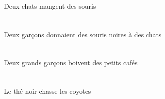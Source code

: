 \begin{exe}
\ex\glll
\INDDuErg{}   \chatDDuErg{}   \INDPlAbs{}   \sourisBPlAbs{}  \mangerVtPrsBPl{}\\
\INDDuErgP{}   \chatDDuErgP{}   \INDPlAbsP{}   \sourisBPlAbsP{}  \mangerVtPrsBPlP{}\\
\INDDuErgG{}   \chatDDuErgG{}   \INDPlAbsG{}   \sourisBPlAbsG{}  \mangerVtPrsBPlG{}\\
Deux chats mangent des souris
\ex\glll
\INDDuErg{}   \garconDDuErg{}    \INDPlDat{}   \chatDPlDat{}   \INDPlAbs{}   \noirBPl{}   \sourisBPlAbs{}  \donnerVdPstBPl{}\\
\INDDuErgP{}   \garconDDuErgP{}    \INDPlDatP{}   \chatDPlDatP{}   \INDPlAbsP{}   \noirBPlP{}   \sourisBPlAbsP{}  \donnerVdPstBPlP{}\\
\INDDuErgG{}   \garconDDuErgG{}    \INDPlDatG{}   \chatDPlDatG{}   \INDPlAbsG{}   \noirBPlG{}   \sourisBPlAbsG{}  \donnerVdPstBPlG{}\\
Deux garçons donnaient des souris noires à des chats
\ex\glll
\INDDuErg{}   \grandDDu{}   \garconDDuErg{}   \INDPlAbs{}   \petitCPl{}   \cafeCPlAbs{}  \boireVtPrsCPl{}\\
\INDDuErgP{}   \grandDDuP{}   \garconDDuErgP{}   \INDPlAbsP{}   \petitCPlP{}   \cafeCPlAbsP{}  \boireVtPrsCPlP{}\\
\INDDuErgG{}   \grandDDuG{}   \garconDDuErgG{}   \INDPlAbsG{}   \petitCPlG{}   \cafeCPlAbsG{}  \boireVtPrsCPlG{}\\
Deux grands garçons boivent des petits cafés
\ex\glll
\DEFSgErg{}   \noirBSg{}   \theBSgErg{}   \DEFPlAbs{}   \coyoteCPlAbs{}  \chasserVtPrsCPl{}\\
\DEFSgErgP{}   \noirBSgP{}   \theBSgErgP{}   \DEFPlAbsP{}   \coyoteCPlAbsP{}  \chasserVtPrsCPlP{}\\
\DEFSgErgG{}   \noirBSgG{}   \theBSgErgG{}   \DEFPlAbsG{}   \coyoteCPlAbsG{}  \chasserVtPrsCPlG{}\\
Le thé noir chasse les coyotes
\ex\glll
\DEMPlErg{}   \troisCPl{}   \chasseurCPlErg{}    \DEFSgDat{}   \petitDSg{}   \blancDSg{}   \garconDSgDat{}   \INDDuAbs{}    \DEFPlObl{}   \plaineAPlObl{}   \DE{}   \autrucheBDuAbs{}  \offrirVdPstBDu{}\\
\DEMPlErgP{}   \troisCPlP{}   \chasseurCPlErgP{}    \DEFSgDatP{}   \petitDSgP{}   \blancDSgP{}   \garconDSgDatP{}   \INDDuAbsP{}    \DEFPlOblP{}   \plaineAPlOblP{}   \DEP{}   \autrucheBDuAbsP{}  \offrirVdPstBDuP{}\\
\DEMPlErgG{}   \troisCPlG{}   \chasseurCPlErgG{}    \DEFSgDatG{}   \petitDSgG{}   \blancDSgG{}   \garconDSgDatG{}   \INDDuAbsG{}    \DEFPlOblG{}   \plaineAPlOblG{}   \DEG{}   \autrucheBDuAbsG{}  \offrirVdPstBDuG{}\\

\end{exe}
